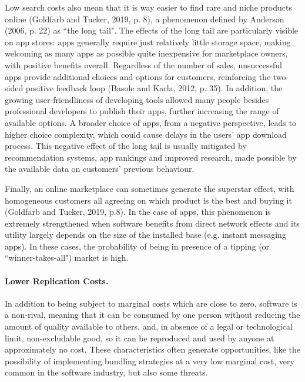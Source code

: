 Low search costs also mean that it is way easier to find rare and niche products online (Goldfarb and Tucker, 2019, p. 8), a phenomenon defined by Anderson (2006, p. 22) as ``the long tail". The effects of the long tail are particularly visible on app stores: apps generally require just relatively little storage space, making welcoming as many apps as possible quite inexpensive for marketplace owners, with positive benefits overall. Regardless of the number of sales, unsuccessful apps provide additional choices and options for customers, reinforcing the two-sided positive feedback loop (Basole and Karla, 2012, p. 35). In addition, the growing user-friendliness of developing tools allowed many people besides professional developers to publish their apps, further increasing the range of available options. A broader choice of apps, from a negative perspective, leads to higher choice complexity, which could cause delays in the users' app download process. This negative effect of the long tail is usually mitigated by recommendation systems, app rankings and improved research, made possible by the available data on customers' previous behaviour.

Finally, an online marketplace can sometimes generate the superstar effect, with homogeneous customers all agreeing on which product is the best and buying it (Goldfarb and Tucker, 2019, p.8). In the case of apps, this phenomenon is extremely strengthened when software benefits from direct network effects and its utility largely depends on the size of the installed base (e.g. instant messaging apps). In these cases, the probability of being in presence of a tipping (or ``winner-takes-all") market is high.

\paragraph{Lower Replication Costs.}
In addition to being subject to marginal costs which are close to zero, software is a non-rival, meaning that it can be consumed by one person without reducing the amount of quality available to others, and, in absence of a legal or technological limit, non-excludable good, so it can be reproduced and used by anyone at approximately no cost. These characteristics often generate opportunities, like the possibility of implementing bundling strategies at a very low marginal cost, very common in the software industry, but also some threats.

